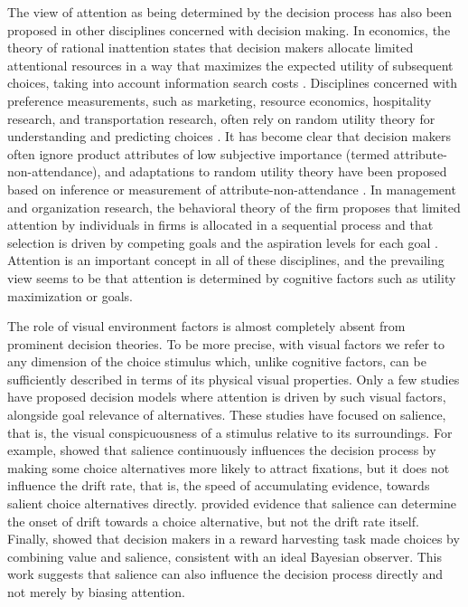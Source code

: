 The view of attention as being determined by the decision process has also been proposed in other disciplines concerned with decision making. In economics, the theory of rational inattention states that decision makers allocate limited attentional resources in a way that maximizes the expected utility of subsequent choices, taking into account information search costs \citep{sims2003}. Disciplines concerned with preference measurements, such as marketing, resource economics, hospitality research, and transportation research, often rely on random utility theory for understanding and predicting choices \citep{louviere2000}. It has become clear that decision makers often ignore product attributes of low subjective importance (termed attribute-non-attendance), and adaptations to random utility theory have been proposed based on inference or measurement of attribute-non-attendance \citep{vanloo2018}. In management and organization research, the behavioral theory of the firm proposes that limited attention by individuals in firms is allocated in a sequential process and that selection is driven by competing goals and the aspiration levels for each goal \citep{ocasio2011}. Attention is an important concept in all of these disciplines, and the prevailing view seems to be that attention is determined by cognitive factors such as utility maximization or goals.

The role of visual environment factors is almost completely absent from prominent decision theories. To be more precise, with visual factors we refer to any dimension of the choice stimulus which, unlike cognitive factors, can be sufficiently described in terms of its physical visual properties. Only a few studies have proposed decision models where attention is driven by such visual factors, alongside goal relevance of alternatives. These studies have focused on salience, that is, the visual conspicuousness of a stimulus relative to its surroundings. For example, \cite{towal2013a} showed that salience continuously influences the decision process by making some choice alternatives more likely to attract fixations, but it does not influence the drift rate, that is, the speed of accumulating evidence, towards salient choice alternatives directly. \cite{chen2013} provided evidence that salience can determine the onset of drift towards a choice alternative, but not the drift rate itself. Finally, \cite{navalpakkam2010} showed that decision makers in a reward harvesting task made choices by combining value and salience, consistent with an ideal Bayesian observer. This work suggests that salience can also influence the decision process directly and not merely by biasing attention.


